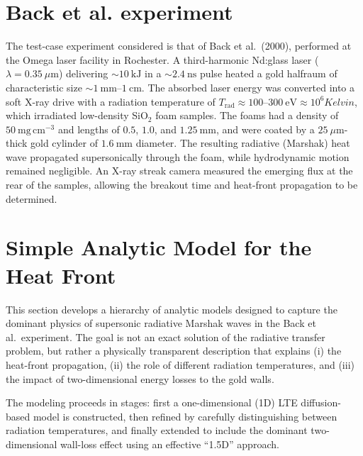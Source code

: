 \documentclass{article}
\begin{document}
\section{Back et al. experiment}
The test-case experiment considered is that of Back et al.\ (2000), performed at the Omega laser facility in Rochester. A third-harmonic Nd:glass laser ($\lambda = 0.35~\mu\mathrm{m}$) delivering $\sim 10~\mathrm{kJ}$ in a $\sim 2.4~\mathrm{ns}$ pulse heated a gold halfraum of characteristic size $\sim 1~\mathrm{mm}$--$1~\mathrm{cm}$. The absorbed laser energy was converted into a soft X-ray drive with a radiation temperature of $T_{\mathrm{rad}} \approx 100$--$300~\mathrm{eV} \approx 10^6 Kelvin$, which irradiated low-density SiO$_2$ foam samples. The foams had a density of $50~\mathrm{mg\,cm^{-3}}$ and lengths of $0.5$, $1.0$, and $1.25~\mathrm{mm}$, and were coated by a $25~\mu\mathrm{m}$-thick gold cylinder of $1.6~\mathrm{mm}$ diameter. The resulting radiative (Marshak) heat wave propagated supersonically through the foam, while hydrodynamic motion remained negligible. An X-ray streak camera measured the emerging flux at the rear of the samples, allowing the breakout time and heat-front propagation to be determined.

\section{Simple Analytic Model for the Heat Front}

This section develops a hierarchy of analytic models designed to capture
the dominant physics of supersonic radiative Marshak waves in the
Back et al.\ experiment.
The goal is not an exact solution of the radiative transfer problem,
but rather a physically transparent description that explains
(i) the heat-front propagation,
(ii) the role of different radiation temperatures,
and (iii) the impact of two-dimensional energy losses to the gold walls.

The modeling proceeds in stages:
first a one-dimensional (1D) LTE diffusion-based model is constructed,
then refined by carefully distinguishing between radiation temperatures,
and finally extended to include the dominant two-dimensional wall-loss effect
using an effective ``1.5D'' approach.
\end{document}
